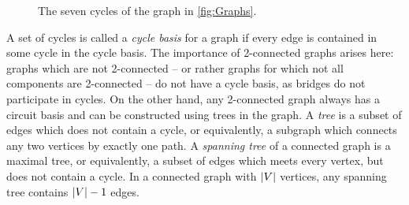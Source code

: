 \documentclass[12pt]{report}
\theoremstyle{definition}
\DeclarePairedDelimiter\abs{\lvert}{\rvert}
\theoremstyle{upright}
\begin{document}
\begin{figure}[H]
\begin{center}
\begin{tikzpicture}
        \end{tikzpicture}

    \end{center}

    \caption{The seven cycles of the graph in \cref{fig:Graphs}.}\label{fig:Cycles}

\end{figure}

A set of cycles is called a \textit{cycle basis} for a graph if every edge is contained in some cycle in the cycle basis.
The importance of 2-connected graphs arises here: graphs which are not 2-connected -- or rather graphs for which not all components are 2-connected -- do not have a cycle basis, as bridges do not participate in cycles.
On the other hand, any 2-connected graph always has a circuit basis and can be constructed using trees in the graph.
A \textit{tree} is a subset of edges which does not contain a cycle, or equivalently, a subgraph which connects any two vertices by exactly one path.
A \textit{spanning tree} of a connected graph is a maximal tree, or equivalently, a subset of edges which meets every vertex, but does not contain a cycle.
In a connected graph with $\abs*{V}$ vertices, any spanning tree contains $\abs*{V}-1$ edges.
\end{document}
